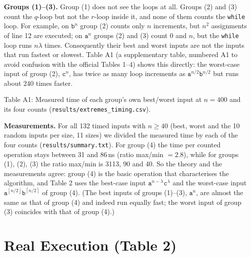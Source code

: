 \documentclass[11pt]{article}
\theoremstyle{remark}
\newcommand{\fl}[1]{\left\lfloor #1\right\rfloor}
\newcommand{\cl}[1]{\left\lceil #1\right\rceil}
\newcommand{\ta}{\texttt{a}}
\newcommand{\tb}{\texttt{b}}
\newcommand{\tc}{\texttt{c}}
\begin{document}
\textbf{Groups (1)--(3).} Group (1) does not see the loops at all. Groups (2) and (3) count the $q$-loop but not the
$r$-loop inside it, and none of them counts the \texttt{while} loop. For example, on $\tb^n$ group (2) counts only $n$
increments, but $n^2$ assignments of line 12 are executed; on $\ta^n$ groups (2) and (3) count $0$ and $n$, but the
\texttt{while} loop runs $n\lambda$ times. Consequently their best and worst inputs are not the inputs that run
fastest or slowest. Table A1 (a supplementary table, numbered A1 to avoid confusion with the official Tables 1--4) shows this directly: the worst-case input of group (2), $\tc^n$, has
twice as many loop increments as $\ta^{n/2}\tb^{n/2}$ but runs about 240 times faster.

\begin{table}[h]
\centering
\parbox{0.9\linewidth}{\centering Table A1: Measured time of each group's own best/worst input at $n=400$ and its four counts (\texttt{results/extremes\_timing.csv}).}\par\smallskip
\small

\end{table}

\textbf{Measurements.} For all 132 timed inputs with $n\ge40$ (best, worst and the 10 random inputs per size, 11 sizes) we
divided the measured time by each of the four counts (\texttt{results/summary.txt}). For group (4) the time per
counted operation stays between 31 and 86\,ns (ratio max/min $=2.8$), while for groups (1), (2), (3) the ratio
max/min is 3113, 90 and 40. So the theory and the measurements agree: group (4) is the basic operation that
characterises the algorithm, and Table 2 uses the best-case input $\ta^{n-\lambda}\tc^{\lambda}$ and the worst-case
input $\ta^{\fl{n/2}}\tb^{\cl{n/2}}$ of group (4). (The best inputs of groups (1)--(3), $\ta^n$, are almost the same
as that of group (4) and indeed run equally fast; the worst input of group (3) coincides with that of group (4).)

\section{Real Execution (Table 2)}
\end{document}
